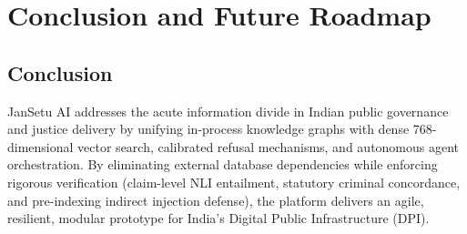 \documentclass[12pt,a4paper,oneside]{report}
\begin{document}
\newpage

\chapter{Conclusion and Future Roadmap}

\section{Conclusion}
JanSetu AI addresses the acute information divide in Indian public governance and justice delivery by unifying in-process knowledge graphs with dense 768-dimensional vector search, calibrated refusal mechanisms, and autonomous agent orchestration. By eliminating external database dependencies while enforcing rigorous verification (claim-level NLI entailment, statutory criminal concordance, and pre-indexing indirect injection defense), the platform delivers an agile, resilient, modular prototype for India's Digital Public Infrastructure (DPI).
\end{document}
